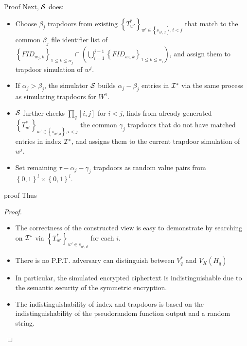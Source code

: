 \documentclass{beamer}
\begin{document}
\begin{frame}{Proof}
	Next, $\cal S$ does:
	\begin{itemize}
		\item Choose ${\beta _j}$ trapdoors from existing ${\left\{ {T_{w'}^*} \right\}_{w' \in \left\{ {{s_{{w^i},d}}} \right\},i < j}}$ that match to the common ${\beta _j}$ file identifier list of ${\left\{ {FI{D_{{w_j},k}}} \right\}_{1 \le k \le {\alpha _j}}} \cap (\bigcup\nolimits_{i = 1}^{j - 1} {{{\left\{ {FI{D_{{w_i},k}}} \right\}}_{1 \le k \le {\alpha _i}}}} )$, and assign them to trapdoor simulation of $w^j$.
		\item If $\alpha_j > \beta_j$, the simulator $\cal S$ builds $\alpha_j - \beta_j$ entries in ${{{\cal I}^*}}$ via the same process as simulating trapdoors for $W^1$.
		\item $\cal S$ further checks ${{\prod _q}[i,j]}$ for $i < j$, finds from already generated ${\left\{ {T_{w'}^*} \right\}_{w' \in \left\{ {{s_{{w^i},d}}} \right\},i < j}}$ the common ${\gamma _j}$ trapdoors that do not have matched entries in index ${{{\cal I}^*}}$, and assigns them to the current trapdoor simulation of $w^j$.
		\item Set remaining $\tau  - {\alpha _j} - {\gamma _j}$ trapdoors as random value pairs from ${\left\{ {0,1} \right\}^l} \times {\left\{ {0,1} \right\}^l}$.
 \end{itemize}
\end{frame}

\begin{frame}{proof}
	Thus
	\begin{proof}
		\begin{itemize}
			\item The correctness of the constructed view is easy to demonstrate by searching on ${{{\cal I}^*}}$ via ${\left\{ {T_{w'}^*} \right\}_{w' \in {s_{{w^i},d}}}}$ for each $i$.
			\item There is no P.P.T. adversary can distinguish between $V_q^*$ and ${V_K}({H_q})$
			\item In particular, the simulated encrypted ciphertext
			is indistinguishable due to the semantic security of the
			symmetric encryption.
			\item The indistinguishability of index and
			trapdoors is based on the indistinguishability of the pseudorandom
			function output and a random string.
		\end{itemize}
	\end{proof}
\end{frame}
\end{document}
